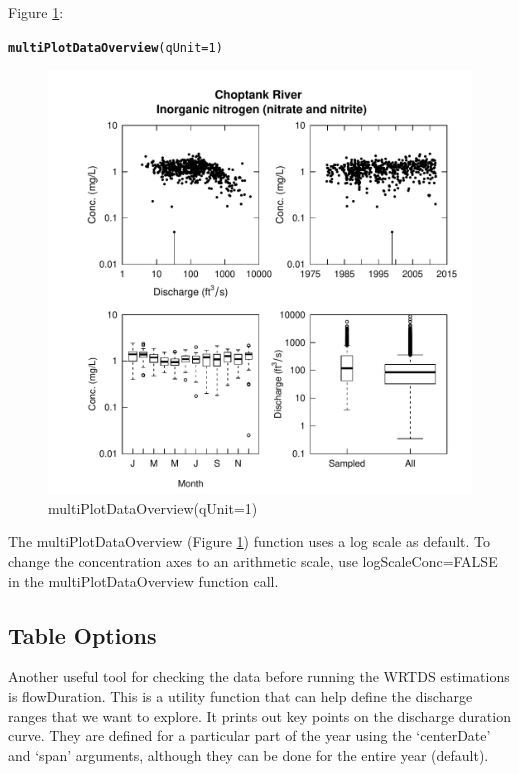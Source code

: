\documentclass[a4paper,11pt]{article}\usepackage[]{graphicx}\usepackage[]{color}
\makeatletter
\newcommand{\hlnum}[1]{\textcolor[rgb]{0.686,0.059,0.569}{#1}}%
\newcommand{\hlstd}[1]{\textcolor[rgb]{0.345,0.345,0.345}{#1}}%
\newcommand{\hlkwc}[1]{\textcolor[rgb]{0.333,0.667,0.333}{#1}}%
\newcommand{\hlkwd}[1]{\textcolor[rgb]{0.737,0.353,0.396}{\textbf{#1}}}%
\newenvironment{kframe}{%
 \def\at@end@of@kframe{}%
 \ifinner\ifhmode%
  \def\at@end@of@kframe{\end{minipage}}%
  \begin{minipage}{\columnwidth}%
 \fi\fi%
 \def\FrameCommand##1{\hskip\@totalleftmargin \hskip-\fboxsep
 \colorbox{shadecolor}{##1}\hskip-\fboxsep
     \hskip-\linewidth \hskip-\@totalleftmargin \hskip\columnwidth}%
 \MakeFramed {\advance\hsize-\width
   \@totalleftmargin\z@ \linewidth\hsize
   \@setminipage}}%
 {\par\unskip\endMakeFramed%
 \at@end@of@kframe}
\newenvironment{knitrout}{}{} %
\makeatother
\begin{document}
Figure \ref{fig:multiPlotDataOverview}:
\begin{knitrout}
\color{fgcolor}\begin{kframe}
\begin{alltt}
\hlkwd{multiPlotDataOverview}\hlstd{(}\hlkwc{qUnit}\hlstd{=}\hlnum{1}\hlstd{)}
\end{alltt}
\end{kframe}\begin{figure}[]

\includegraphics[width=1\linewidth,height=1\linewidth]{figure/multiPlotDataOverview} \caption[multiPlotDataOverview(qUnit=1)]{multiPlotDataOverview(qUnit=1)\label{fig:multiPlotDataOverview}}
\end{figure}


\end{knitrout}

The multiPlotDataOverview (Figure \ref{fig:multiPlotDataOverview}) function uses a log scale as default. To change the concentration axes to an arithmetic scale, use logScaleConc=FALSE in the multiPlotDataOverview function call.

\FloatBarrier

\subsection{Table Options}
\label{sec:tableOptionsWQ}
Another useful tool for checking the data before running the WRTDS estimations is flowDuration. This is a utility function that can help define the discharge ranges that we want to explore.  It prints out key points on the discharge duration curve.  They are defined for a particular part of the year using the `centerDate' and `span' arguments, although they can be done for the entire year (default).  
\end{document}
